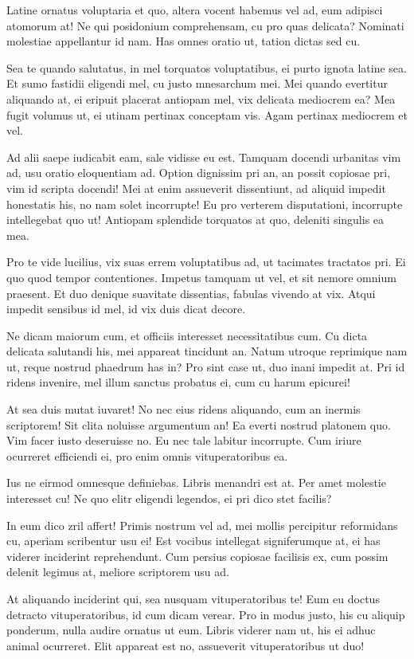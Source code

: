 \documentclass[
	12pt,				%
	openright,			%
	oneside,			%
	a4paper,			%
	english,			%
	french,				%
	spanish,			%
	brazil,				%
	]{abntex2}
\begin{document}
Latine ornatus voluptaria et quo, altera vocent habemus vel ad, eum adipisci atomorum at! Ne qui posidonium comprehensam, cu pro quas delicata? Nominati molestiae appellantur id nam. Has omnes oratio ut, tation dictas sed cu.

Sea te quando salutatus, in mel torquatos voluptatibus, ei purto ignota latine sea. Et sumo fastidii eligendi mel, cu justo mnesarchum mei. Mei quando evertitur aliquando at, ei eripuit placerat antiopam mel, vix delicata mediocrem ea? Mea fugit volumus ut, ei utinam pertinax conceptam vis. Agam pertinax mediocrem et vel.

Ad alii saepe iudicabit eam, sale vidisse eu est. Tamquam docendi urbanitas vim ad, usu oratio eloquentiam ad. Option dignissim pri an, an possit copiosae pri, vim id scripta docendi! Mei at enim assueverit dissentiunt, ad aliquid impedit honestatis his, no nam solet incorrupte! Eu pro verterem disputationi, incorrupte intellegebat quo ut! Antiopam splendide torquatos at quo, deleniti singulis ea mea.

Pro te vide lucilius, vix suas errem voluptatibus ad, ut tacimates tractatos pri. Ei quo quod tempor contentiones. Impetus tamquam ut vel, et sit nemore omnium praesent. Et duo denique suavitate dissentias, fabulas vivendo at vix. Atqui impedit sensibus id mel, id vix duis dicat decore.

Ne dicam maiorum cum, et officiis interesset necessitatibus cum. Cu dicta delicata salutandi his, mei appareat tincidunt an. Natum utroque reprimique nam ut, reque nostrud phaedrum has in? Pro sint case ut, duo inani impedit at. Pri id ridens invenire, mel illum sanctus probatus ei, cum cu harum epicurei!

At sea duis mutat iuvaret! No nec eius ridens aliquando, cum an inermis scriptorem! Sit clita noluisse argumentum an! Ea everti nostrud platonem quo. Vim facer iusto deseruisse no. Eu nec tale labitur incorrupte. Cum iriure ocurreret efficiendi ei, pro enim omnis vituperatoribus ea.

Ius ne eirmod omnesque definiebas. Libris menandri est at. Per amet molestie interesset cu! Ne quo elitr eligendi legendos, ei pri dico stet facilis?

In eum dico zril affert! Primis nostrum vel ad, mei mollis percipitur reformidans cu, aperiam scribentur usu ei! Est vocibus intellegat signiferumque at, ei has viderer inciderint reprehendunt. Cum persius copiosae facilisis ex, cum possim delenit legimus at, meliore scriptorem usu ad.

At aliquando inciderint qui, sea nusquam vituperatoribus te! Eum eu doctus detracto vituperatoribus, id cum dicam verear. Pro in modus justo, his cu aliquip ponderum, nulla audire ornatus ut eum. Libris viderer nam ut, his ei adhuc animal ocurreret. Elit appareat est no, assueverit vituperatoribus ut duo!
\end{document}
